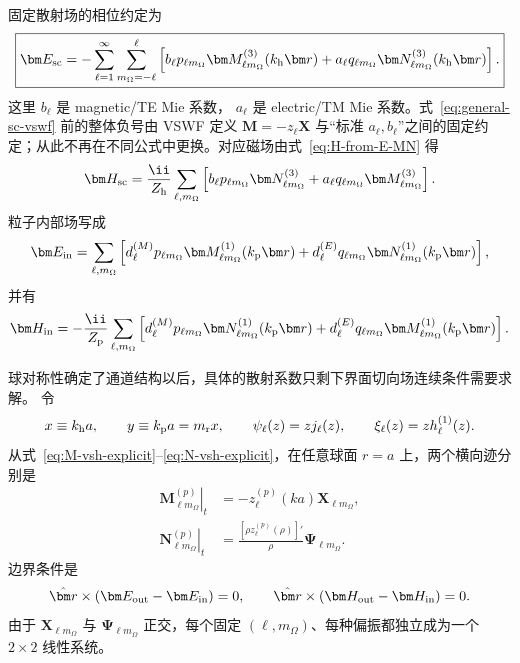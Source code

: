 固定散射场的相位约定为
\begin{equation}
\boxed{
\bm E_{\rm sc}
=-\sum_{\ell=1}^{\infty}
\sum_{m_{\Omega}=-\ell}^{\ell}
\left[
 b_\ell p_{\ell m_{\Omega}}\bm M_{\ell m_{\Omega}}^{(3)}(k_{\rm h}\bm r)
+a_\ell q_{\ell m_{\Omega}}\bm N_{\ell m_{\Omega}}^{(3)}(k_{\rm h}\bm r)
\right].}
\label{eq:general-sc-vswf}
\end{equation}
这里
$b_\ell$ 是 magnetic/TE Mie 系数，
$a_\ell$ 是 electric/TM Mie 系数。式~\eqref{eq:general-sc-vswf} 前的整体负号由 VSWF 定义
$\bm M=-z_\ell\bm X$ 与“标准 $a_\ell,b_\ell$”之间的固定约定；从此不再在不同公式中更换。对应磁场由式~\eqref{eq:H-from-E-MN} 得
\begin{equation}
\bm H_{\rm sc}
=\frac{\ii}{Z_{\rm h}}
\sum_{\ell,m_{\Omega}}
\left[
 b_\ell p_{\ell m_{\Omega}}\bm N_{\ell m_{\Omega}}^{(3)}
+a_\ell q_{\ell m_{\Omega}}\bm M_{\ell m_{\Omega}}^{(3)}
\right].
\label{eq:general-sc-vswf-H}
\end{equation}
粒子内部场写成
\begin{equation}
\bm E_{\rm in}
=\sum_{\ell,m_{\Omega}}
\left[
 d_\ell^{(M)}p_{\ell m_{\Omega}}\bm M_{\ell m_{\Omega}}^{(1)}(k_{\rm p}\bm r)
+d_\ell^{(E)}q_{\ell m_{\Omega}}\bm N_{\ell m_{\Omega}}^{(1)}(k_{\rm p}\bm r)
\right],
\label{eq:general-int-vswf}
\end{equation}
并有
\begin{equation}
\bm H_{\rm in}
=-\frac{\ii}{Z_{\rm p}}
\sum_{\ell,m_{\Omega}}
\left[
 d_\ell^{(M)}p_{\ell m_{\Omega}}\bm N_{\ell m_{\Omega}}^{(1)}(k_{\rm p}\bm r)
+d_\ell^{(E)}q_{\ell m_{\Omega}}\bm M_{\ell m_{\Omega}}^{(1)}(k_{\rm p}\bm r)
\right].
\end{equation}

球对称性确定了通道结构以后，具体的散射系数只剩下界面切向场连续条件需要求解。
令
\begin{equation}
x\equiv k_{\rm h}a,
\qquad
y\equiv k_{\rm p}a=m_{\rm r}x,
\qquad
\psi_\ell(z)=zj_\ell(z),
\qquad
\xi_\ell(z)=zh_\ell^{(1)}(z).
\label{eq:riccati-bessel}
\end{equation}
从式~\eqref{eq:M-vsh-explicit}--\eqref{eq:N-vsh-explicit}，在任意球面 $r=a$ 上，两个横向迹分别是
\begin{align}
\left.\bm M_{\ell m_{\Omega}}^{(p)}\right|_{t}
&=-z_\ell^{(p)}(ka)\bm X_{\ell m_{\Omega}},
\\
\left.\bm N_{\ell m_{\Omega}}^{(p)}\right|_{t}
&=\frac{[\rho z_\ell^{(p)}(\rho)]'}{\rho}
\bm\Psi_{\ell m_{\Omega}}.
\label{eq:MN-tangential-traces}
\end{align}
边界条件是
\begin{equation}
\hat{\bm r}\times
(\bm E_{\rm out}-\bm E_{\rm in})=0,
\qquad
\hat{\bm r}\times
(\bm H_{\rm out}-\bm H_{\rm in})=0.
\label{eq:maxwell-tangential-bc}
\end{equation}
由于 $\bm X_{\ell m_{\Omega}}$ 与 $\bm\Psi_{\ell m_{\Omega}}$ 正交，每个固定
$(\ell,m_{\Omega})$、每种偏振都独立成为一个 $2\times2$ 线性系统。

